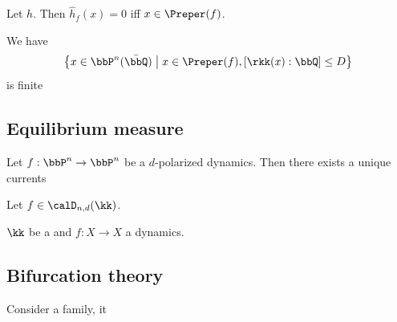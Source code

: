 \begin{corollary}[label=\labelNFM{cor:zero-of-canonical-height-was-preperiodic-points}, status=draft, tag=0000000]
	Let $h$.
	Then $\hat{h}_f(x) = 0$ iff $x \in \Preper(f)$.
\end{corollary}

\begin{corollary}[label=\labelNFM{cor:finiteness-of-preperiodic-points-of-finite-degree-defined-field}, status=draft, tag=0000000]
	We have
	\[ \left\{ x \in \bbP^n(\bar{\bbQ}) \;\middle|\; x \in \Preper(f), [\rkk(x): \bbQ] \leq D \right\} \]
	is finite \Yang{}
\end{corollary}



\subsection[status=draft,tag=0000000,label=\labelNFM{subsec:equilibrium-measure-and-julia-sets}]{Equilibrium measure}

\begin{lemma}[label=\labelNFM{lem:existence-of-green-currents-and-functions-for-dynamics-on-pn}, status=draft, tag=0000000]
	Let $f: \bbP^n \to \bbP^n$ be a $d$-polarized dynamics.
	Then there exists a unique currents \Yang{}
\end{lemma}


\begin{definition}[label=\labelNFM{def:equilibrium-measure}, status=draft, tag=0000000]
	Let $f \in \calD_{n,d}(\kk)$.

	$\kk$ be a and $f:X \to X$ a dynamics.
	\Yang{}
\end{definition}











\subsection[status=draft,tag=0000000,label=\labelNFM{subsec:bifurcation-theory}]{Bifurcation theory}

\begin{definition}[label=\labelNFM{def:bifurcation-measure}, status=draft, tag=0000000]
	Consider a family, it \Yang{}
	\Yang{}
\end{definition}









